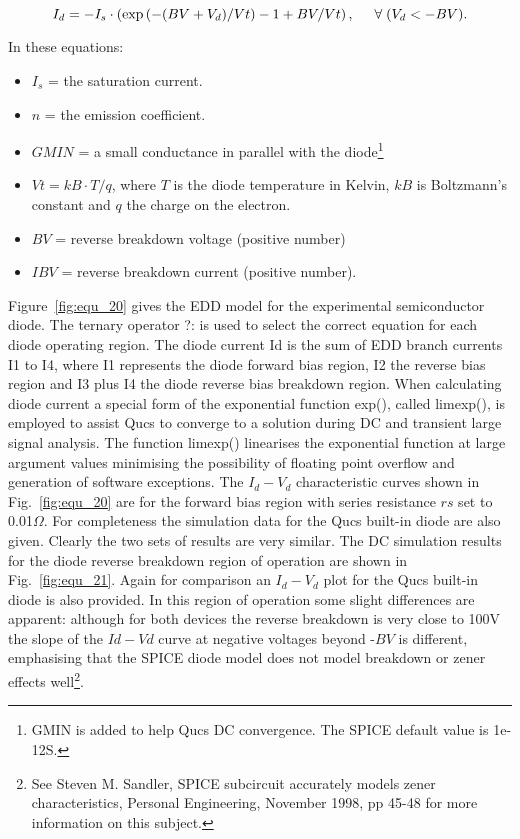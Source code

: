 \begin{equation}
 I_{d} = -I_{s}\cdot \left( \exp\left(-(BV+V_{d})/Vt\right)-1+BV/Vt\right), \hspace{5mm} \forall\; (V_{d } < -BV).
\end{equation} 

\vspace{3mm}

In these equations:
\begin{itemize}
 \item $I_{s}$ = the saturation current.
 \item $n$ = the emission coefficient.
 \item $GMIN$ = a small conductance in parallel with the diode\footnote{GMIN is added to help Qucs DC convergence. The SPICE default value is 1e-12S.}
 \item $Vt = kB\cdot T/q$, where $T$ is the diode temperature in Kelvin, $kB$ is Boltzmann's constant and $q$ the charge on the electron.
 \item $BV$ = reverse breakdown voltage (positive number) 
 \item $IBV$ = reverse breakdown current (positive number).
\end{itemize}

Figure~\ref{fig:equ_20} gives the EDD model for the experimental
semiconductor diode. The ternary operator ?: is used to select the
correct equation for each diode operating region. The diode current Id
is the sum of EDD branch currents I1 to I4, where I1 represents the
diode forward bias region, I2 the reverse bias region and I3 plus I4
the diode reverse bias breakdown region. When calculating diode
current a special form of the exponential function exp(), called
limexp(), is employed to assist Qucs to converge to a solution during
DC and transient large signal analysis. The function limexp()
linearises the exponential function at large argument values
minimising the possibility of floating point overflow and generation
of software exceptions. The $I_{d}-V_{d}$ characteristic curves shown
in Fig.~\ref{fig:equ_20} are for the forward bias region with series
resistance $rs$ set to 0.01$\Omega$. For completeness the simulation
data for the Qucs built-in diode are also given. Clearly the two sets
of results are very similar. The DC simulation results for the diode
reverse breakdown region of operation are shown in
Fig.~\ref{fig:equ_21}. Again for comparison an $I_{d}-V_{d}$ plot for
the Qucs built-in diode is also provided. In this region of operation
some slight differences are apparent: although for both devices the
reverse breakdown is very close to 100V the slope of the $Id-Vd$ curve
at negative voltages beyond -$BV$ is different, emphasising that the
SPICE diode model does not model breakdown or zener effects
well\footnote{See Steven M. Sandler, SPICE subcircuit accurately
models zener characteristics, Personal Engineering, November 1998, pp
45-48 for more information on this subject.}.

